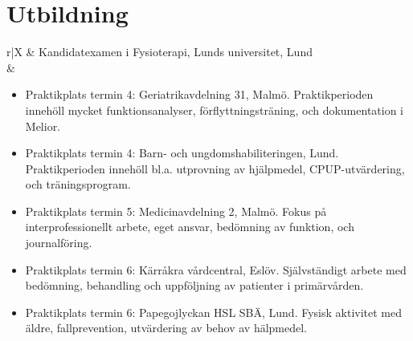 \documentclass[11pt,a4paper]{article}
\begin{document}
\section{Utbildning}
\hspace{-4pt}
\begin{tabularx}{\textwidth}{r|X}	
	& Kandidatexamen i Fysioterapi, Lunds universitet, Lund\\
	&\footnotesize{\vspace{-5pt}
		 \begin{itemize}[leftmargin=10pt, topsep=-12.5pt]

		\item Praktikplats termin 4: Geriatrikavdelning 31, Malmö. Praktikperioden innehöll mycket funktionsanalyser, förflyttningsträning, och dokumentation i Melior. 
		
		\item Praktikplats termin 4: Barn- och ungdomshabiliteringen, Lund. Praktikperioden innehöll bl.a. utprovning av hjälpmedel, CPUP-utvärdering, och träningsprogram.
		
		\item Praktikplats termin 5: Medicinavdelning 2, Malmö.
		Fokus på interprofessionellt arbete, eget ansvar, bedömning av funktion, och journalföring.
		
		\item Praktikplats termin 6: Kärråkra vårdcentral, Eslöv. Självständigt arbete med bedömning, behandling och uppföljning av patienter i primärvården.
		
		\item Praktikplats termin 6: Papegojlyckan HSL SBÄ, Lund.
		Fysisk aktivitet med äldre, fallprevention, utvärdering av behov av hälpmedel.
				
		\end{itemize}\vspace{-30pt} 
	}\\
	 \\
\end{tabularx}

\end{document}
